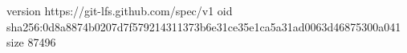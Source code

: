version https://git-lfs.github.com/spec/v1
oid sha256:0d8a8874b0207d7f579214311373b6e31ce35e1ca5a31ad0063d46875300a041
size 87496
